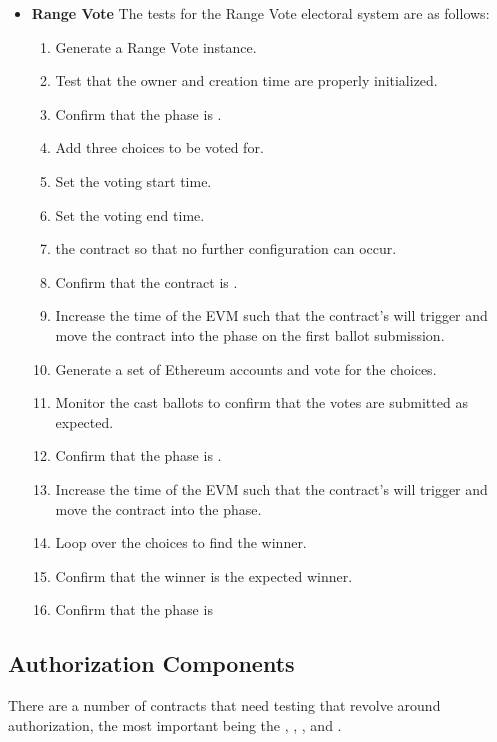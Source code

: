 \begin{itemize}
  \item \textbf{Range Vote} The tests for the Range Vote electoral system are as
    follows:
    \begin{enumerate}
      \item Generate a Range Vote instance.
      \item Test that the owner and creation time are properly initialized.
      \item Confirm that the phase is .
      \item Add three choices to be voted for.
      \item Set the voting start time.
      \item Set the voting end time.
      \item {} the contract so that no further configuration can occur.
      \item Confirm that the contract is .
      \item Increase the time of the EVM such that the contract's
         will trigger and move the contract into the
         phase on the first ballot submission.
      \item Generate a set of Ethereum accounts and vote for the choices.
      \item Monitor the cast ballots to confirm that the votes are submitted as
        expected.
      \item Confirm that the phase is .
      \item Increase the time of the EVM such that the contract's
         will trigger and move the contract into the
         phase.
      \item Loop over the choices to find the winner.
      \item Confirm that the winner is the expected winner.
      \item Confirm that the phase is 
    \end{enumerate}
\end{itemize}

\subsection{Authorization Components}
There are a number of contracts that need testing that revolve around
authorization, the most important being the ,
, , and .

